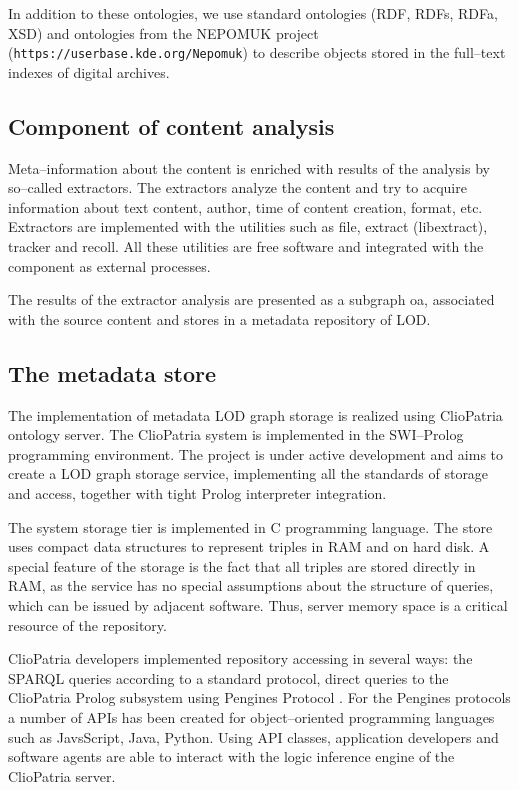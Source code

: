 \documentclass[conference,a4paper]{IEEEtran}
\providecommand\url[1]{\texttt{#1}}
\begin{document}
In addition to these ontologies, we use standard ontologies (RDF, RDFs,
RDFa, XSD) and ontologies from the NEPOMUK project
(\url{https://userbase.kde.org/Nepomuk}) to describe objects stored in the
full--text indexes of digital archives.

\subsection{Component of content analysis}

Meta--information about the content is enriched with results of the
analysis by so--called extractors. The extractors analyze the content and
try to acquire information about text content, author, time of content
creation, format, etc. Extractors are implemented with the utilities
such as file, extract (libextract), tracker and recoll. All these
utilities are free software and integrated with the component as
external processes.

The results of the extractor analysis are presented as a subgraph oa,
associated with the source content and stores in a metadata repository
of LOD.

\subsection{The metadata store}

The implementation of metadata LOD graph storage is realized using
ClioPatria \cite{b8} ontology server. The ClioPatria system is implemented
in the SWI--Prolog programming environment. The project is under active
development and aims to create a LOD graph storage service, implementing
all the standards of storage and access, together with tight Prolog
interpreter integration.

The system storage tier is implemented in C programming language. The
store uses compact data structures to represent triples in RAM and on
hard disk. A special feature of the storage is the fact that all triples
are stored directly in RAM, as the service has no special assumptions
about the structure of queries, which can be issued by adjacent
software. Thus, server memory space is a critical resource of the
repository.

ClioPatria developers implemented repository accessing in several ways:
the SPARQL queries according to a standard protocol, direct queries to
the ClioPatria Prolog subsystem using Pengines Protocol \cite{b9}. For the
Pengines protocols a number of APIs has been created for object--oriented
programming languages such as JavsScript, Java, Python. Using API
classes, application developers and software agents are able to interact
with the logic inference engine of the ClioPatria server.
\end{document}
